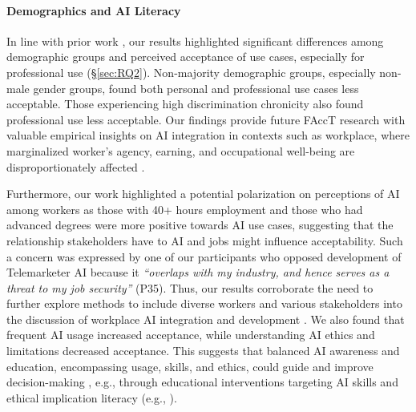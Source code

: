 \paragraph{Demographics and AI Literacy}
In line with prior work \cite{kingsley2024investigating, mun2024participaidemocraticsurveyingframework}, our results highlighted significant differences among demographic groups and perceived acceptance of use cases, especially for professional use (\S\ref{sec:RQ2}). Non-majority demographic groups, especially non-male gender groups, found both personal and professional use cases less acceptable. Those experiencing high discrimination chronicity also found professional use less acceptable. 
Our findings provide future FAccT research with valuable empirical insights on AI integration in contexts such as workplace, where marginalized worker's agency, earning, and occupational well-being are disproportionately affected \citep{ming2024labor,alcover2021aging}. 

Furthermore, our work highlighted a potential polarization on perceptions of AI among workers as those with 40+ hours employment and those who had advanced degrees were more positive towards AI use cases, suggesting that the relationship stakeholders have to AI and jobs might influence acceptability. Such a concern was expressed by one of our participants who opposed development of Telemarketer AI because it \textit{``overlaps with my industry, and hence serves as a threat to my job security''} (P35). Thus, our results corroborate the need to further explore methods to include diverse workers and various stakeholders into the discussion of workplace AI integration and development \citep{fox2020worker,cheon2023bigtechwork}. We also found that frequent AI usage increased acceptance, while understanding AI ethics and limitations decreased acceptance. This suggests that balanced AI awareness and education, encompassing usage, skills, and ethics, could guide and improve decision-making \citep{raji2021ethics}, e.g., through educational interventions targeting AI skills and ethical implication literacy (e.g., \citep{wong2021timelines, shen2021value}). 

